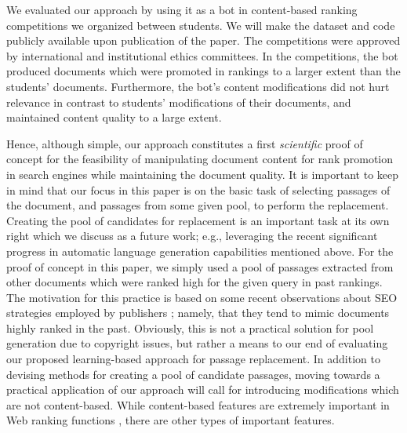 
We evaluated our approach by using it as a bot
in content-based ranking competitions we organized between students.
We will make the dataset and code publicly available upon publication
of the paper. The competitions were approved by international and institutional ethics committees.
In the competitions, the bot produced documents which were promoted in
rankings to a larger extent than the students' documents. Furthermore,
the bot's content modifications did not hurt relevance in
contrast to students' modifications of their documents, and maintained
content quality to a large extent.

Hence, although simple, our approach constitutes a first {\em
  scientific} proof of concept for the feasibility of manipulating
document content for rank promotion in search engines while
maintaining the document quality. It is important to keep in mind that
our focus in this paper is on the basic task of selecting passages of
the document, and passages from some given pool, to perform the
replacement. Creating the pool of candidates for replacement is an
important task at its own right which we discuss as a future work;
e.g., leveraging the recent significant progress in automatic language
generation capabilities mentioned above. For the proof
of concept in this paper, we simply used a pool of passages extracted
from other documents which were ranked high for the given query in
past rankings. The motivation for this practice is based on some recent observations about SEO strategies
employed by publishers \cite{Raifer+al:17a}; namely, that they tend to mimic documents highly ranked in the past. Obviously, this is not
a practical solution for pool generation due to copyright issues, but rather a
means to our end of evaluating our proposed learning-based approach for passage
replacement. In addition to devising methods for creating a pool of candidate passages, moving towards a practical application of our approach
will call for introducing modifications which are not
content-based. While content-based features are extremely important in
Web ranking functions \cite{Liu:11a}, there are other types of important features.

